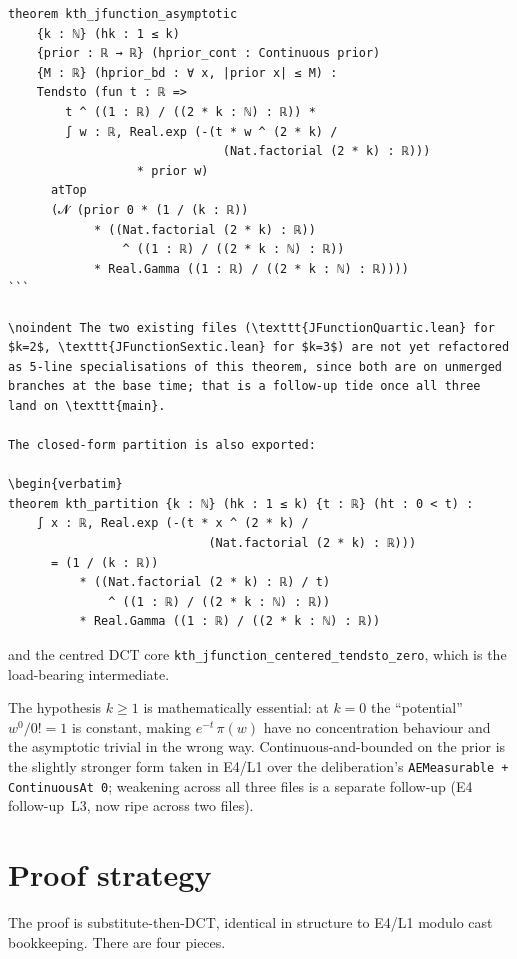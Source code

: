 \documentclass[11pt]{article}
\begin{document}
\begin{verbatim}
theorem kth_jfunction_asymptotic
    {k : ℕ} (hk : 1 ≤ k)
    {prior : ℝ → ℝ} (hprior_cont : Continuous prior)
    {M : ℝ} (hprior_bd : ∀ x, |prior x| ≤ M) :
    Tendsto (fun t : ℝ =>
        t ^ ((1 : ℝ) / ((2 * k : ℕ) : ℝ)) *
        ∫ w : ℝ, Real.exp (-(t * w ^ (2 * k) /
                              (Nat.factorial (2 * k) : ℝ)))
                  * prior w)
      atTop
      (𝓝 (prior 0 * (1 / (k : ℝ))
            * ((Nat.factorial (2 * k) : ℝ))
                ^ ((1 : ℝ) / ((2 * k : ℕ) : ℝ))
            * Real.Gamma ((1 : ℝ) / ((2 * k : ℕ) : ℝ))))
```

\noindent The two existing files (\texttt{JFunctionQuartic.lean} for
$k=2$, \texttt{JFunctionSextic.lean} for $k=3$) are not yet refactored
as 5-line specialisations of this theorem, since both are on unmerged
branches at the base time; that is a follow-up tide once all three
land on \texttt{main}.

The closed-form partition is also exported:

\begin{verbatim}
theorem kth_partition {k : ℕ} (hk : 1 ≤ k) {t : ℝ} (ht : 0 < t) :
    ∫ x : ℝ, Real.exp (-(t * x ^ (2 * k) /
                            (Nat.factorial (2 * k) : ℝ)))
      = (1 / (k : ℝ))
          * ((Nat.factorial (2 * k) : ℝ) / t)
              ^ ((1 : ℝ) / ((2 * k : ℕ) : ℝ))
          * Real.Gamma ((1 : ℝ) / ((2 * k : ℕ) : ℝ))
\end{verbatim}

\noindent and the centred DCT core
\texttt{kth\_jfunction\_centered\_tendsto\_zero}, which is the
load-bearing intermediate.

The hypothesis $k \ge 1$ is mathematically essential: at $k=0$ the
``potential'' $w^{0}/0! = 1$ is constant, making
$e^{-t}\,\pi(w)$ have no concentration behaviour and the asymptotic
trivial in the wrong way. Continuous-and-bounded on the prior is the
slightly stronger form taken in E4/L1 over the deliberation's
\texttt{AEMeasurable + ContinuousAt 0}; weakening across all three
files is a separate follow-up (E4 follow-up~L3, now ripe across two
files).

\section{Proof strategy}

The proof is substitute-then-DCT, identical in structure to E4/L1
modulo cast bookkeeping. There are four pieces.
\end{document}
